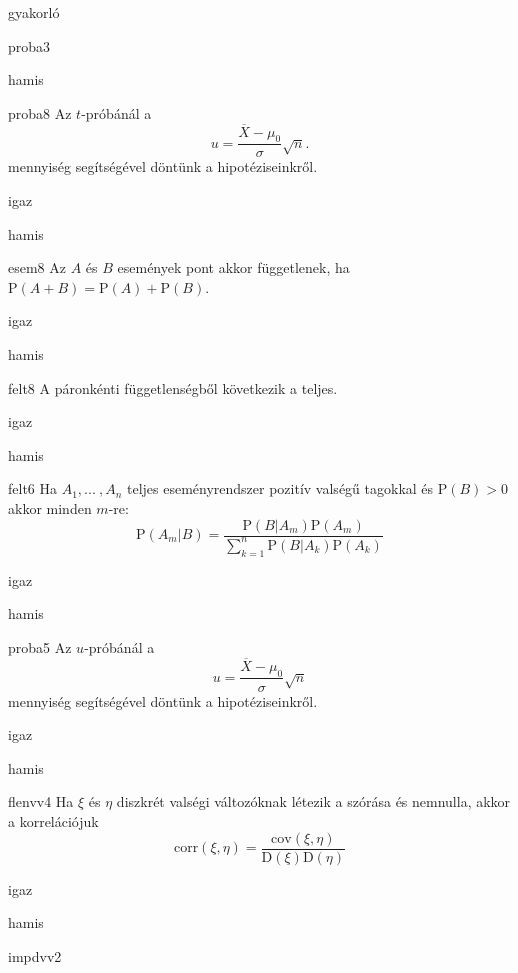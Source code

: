 \documentclass[12pt]{article}
\begin{document}
\begin{quiz}{gyakorló}
\begin{multi}[feedback={Ezek az $t$-próba használatának előzményei.}]{proba3}
\item hamis
\end{multi}
\begin{multi}[feedback={A fenti formula a $u$-próba ún. próbastatisztikája.}]{proba8}
Az $t$-próbánál a 
$$
u=\frac{\overline{X}-\mu_0}{\sigma}\sqrt{n}.
$$
mennyiség segítségével döntünk a hipotéziseinkről.
\item igaz
\item* hamis
\end{multi}
\begin{multi}[feedback={Definíció.}]{esem8}
Az $A$ és $B$ események pont akkor függetlenek, ha $\mathrm{P}(A+B)=\mathrm{P}(A)+\mathrm{P}(B)$.
\item igaz
\item* hamis
\end{multi}
\begin{multi}[feedback={A páronkénti gyengébb tulajdonság.}]{felt8}
A páronkénti függetlenségből következik a teljes.
\item igaz
\item* hamis
\end{multi}
\begin{multi}[feedback={Bayes-tétel}]{felt6}
Ha $A_1,{...\:},A_n$ teljes eseményrendszer pozitív valségű tagokkal és $\mathrm{P}(B)>0$ akkor minden $m$-re:
$$
\mathrm{P}(A_m|B)=\frac{\mathrm{P}(B|A_m)\mathrm{P}(A_m)}{\sum_{k=1}^n \mathrm{P}(B|A_k)\mathrm{P}(A_k)}
$$
\item* igaz
\item hamis
\end{multi}
\begin{multi}[feedback={A fenti formula az $u$-próba ún. próbastatisztikája.}]{proba5}
Az $u$-próbánál a 
$$
u=\frac{\overline{X}-\mu_0}{\sigma}\sqrt{n}
$$
mennyiség segítségével döntünk a hipotéziseinkről.
\item* igaz
\item hamis
\end{multi}
\begin{multi}[feedback={Def.}]{flenvv4}
Ha $\xi$ és $\eta$ diszkrét valségi változóknak létezik a szórása és nemnulla, akkor a 
korrelációjuk
$$
\mathrm{corr}(\xi,\eta)=\frac{\mathrm{cov}(\xi,\eta)}{\mathrm{D}(\xi)\mathrm{D}(\eta)}
$$
\item* igaz
\item hamis
\end{multi}
\begin{multi}[feedback={$\xi=\xi_1+{...\:}+\xi_n$, ahol $\xi_k$ Bernoulli és $\mathrm{E}(\xi_k)=p$+$\mathrm{E}$-additívitása}]{impdvv2}

\end{multi}
\end{quiz}
\end{document}
